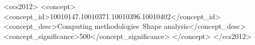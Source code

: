 \documentclass[tog]{acmsiggraph}
\begin{document}



\begin{CCSXML}
<ccs2012>
<concept>
<concept_id>10010147.10010371.10010396.10010402</concept_id>
<concept_desc>Computing methodologies~Shape analysis</concept_desc>
<concept_significance>500</concept_significance>
</concept>
</ccs2012>
\end{CCSXML}


\keywordlist

\conceptlist

\printcopyright









% 



\end{document}
